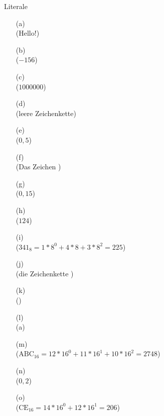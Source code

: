 \begin{frame}[t]
\begin{exercise}{Literale}
\begin{solution}
\begin{center}
\begin{minipage}{0.3\textwidth}
\begin{itemize}
\item[(a)]  \\ (Hello!)
\item[(b)]     \\ ($-156$)
\item[(c)]  \\ ($1000000$)
\item[(d)]  \\ (leere Zeichenkette)
\item[(e)]  \\ ($0{,}5$)
\end{itemize}
\end{minipage}
\begin{minipage}{0.3\textwidth}
\begin{itemize}
\item[(f)]    \\ (Das Zeichen \grqq)
\item[(g)]  \\ ($0{,}15$)
\item[(h)]   \\ ($124$)
\item[(i)]     \\ ($341_8 = 1*8^0 + 4*8 + 3*8^2 = 225$)
\item[(j)]  \\ (die Zeichenkette \grqq)
\end{itemize}
\end{minipage}
\begin{minipage}{0.3\textwidth}
\begin{itemize}
\item[(k)]  \\ ()
\item[(l)]     \\ (a)
\item[(m)]      \\ ($\mathrm{ABC}_{16} = 12*16^0+11*16^1+10*16^2 = 2748$)
\item[(n)]   \\ ($0{,}2$)
\item[(o)]     \\ ($\mathrm{CE}_{16} = 14*16^0 + 12*16^1 = 206$)
\end{itemize}
\end{minipage}
\end{center}
\end{solution}

\end{exercise}
\end{frame}
